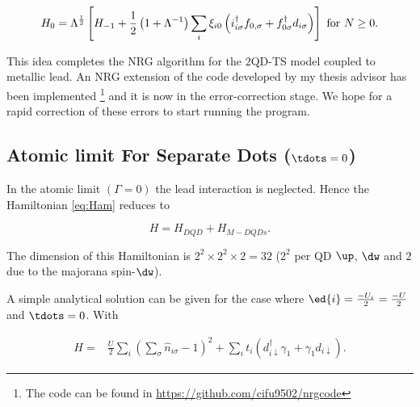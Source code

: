 \[
H_{0}=\Lambda^{\frac{1}{2}}\left[H_{-1}+\frac{1}{2}\left(1+\Lambda^{-1}\right)\sum_{i}\xi_{i0}\left(i_{i\sigma}^{\dagger}f_{0,\sigma}+f_{0\sigma}^{\dagger}d_{i\sigma}\right)\right]\ \mbox{for \ensuremath{N\geq0}}.
\]


This idea completes the NRG algorithm for the $2$QD-TS model coupled
to metallic lead. An NRG extension of the code developed by my thesis
advisor has been implemented \footnote{The code can be found in \url{https://github.com/cifu9502/nrgcode}}
and it is now in the error-correction stage. We hope for a rapid correction
of these errors to start running the program. 



\subsection{Atomic limit For Separate Dots ($\tdots=0$)}
\label{sec:AtomicLimit}


In the atomic limit $(\Gamma = 0)$ the lead interaction is neglected. Hence the Hamiltonian \eqref{eq:Ham} reduces to 

    \begin{equation}
        H=H_{DQD}+H_{M-DQDs}.
    \end{equation}
    
The dimension of this Hamiltonian is $2^2\times2^2\times 2 =32$ ($2^2$ per QD $\up$, $\dw$ and $2$ due to the majorana spin-$\dw$). 

A simple analytical solution can be given for the case where  $\ed{i}=\frac{-U_i}{2}=\frac{-U}{2}$ and $\tdots = 0$. With

    \begin{eqnarray}
        H=  & \frac{U}{2}\sum_i(\sum_{\sigma} \hat{n}_{i\sigma}-1)^{2} +  \sum_{i} t_i \left(d_{i\downarrow}^{\dagger}\gamma_{1}+\gamma_{1}d_{i\downarrow}\right).
        \label{eq:AtomicHam}
    \end{eqnarray}


